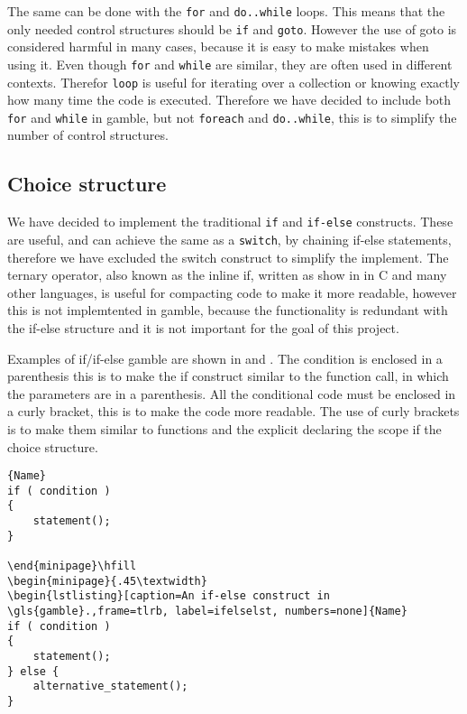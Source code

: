 The same can be done with the \texttt{for} and \texttt{do..while} loops. 
This means that the only needed control structures should be \texttt{if} and \texttt{goto}. 
However the use of goto is considered harmful in many cases, because it is easy to make mistakes when using it. \citep{DijkstraGoto}
Even though \texttt{for} and \texttt{while} are similar, they are often used in different contexts.
Therefor \texttt{loop} is useful for iterating over a collection or knowing exactly how many time the code is executed. 
Therefore we have decided to include both \texttt{for} and \texttt{while} in \gls{gamble}, but not \texttt{foreach} and \texttt{do..while}, this is to simplify the number of control structures.

\subsection{Choice structure}
We have decided to implement the traditional \texttt{if} and \texttt{if-else} constructs. 
These are useful, and can achieve the same as a \texttt{switch}, by chaining if-else statements, therefore we have excluded the switch construct to simplify the implement. 
The ternary operator, also known as the inline if, written as show in  in C and many other languages, is useful for compacting code to make it more readable, however this is not implemtented in \gls{gamble}, because the functionality is redundant with the if-else structure and it is not important for the goal of this project.

Examples of if/if-else \gls{gamble} are shown in  and . 
The condition is enclosed in a parenthesis this is to make the if construct similar to the function call, in which the parameters are in a parenthesis. 
All the conditional code must be enclosed in a curly bracket, this is to make the code more readable. 
The use of curly brackets is to make them similar to functions and the explicit declaring the scope if the choice structure.

\noindent\begin{minipage}{.45\textwidth}
\begin{lstlisting}[caption=An if construct in \gls{gamble}.,frame=tlrb, label=iflst, numbers=none]{Name}
if ( condition )
{
    statement();
}

\end{minipage}\hfill
\begin{minipage}{.45\textwidth}
\begin{lstlisting}[caption=An if-else construct in \gls{gamble}.,frame=tlrb, label=ifelselst, numbers=none]{Name}
if ( condition )
{
    statement();
} else {
    alternative_statement();
}
\end{lstlisting}
\end{minipage}


